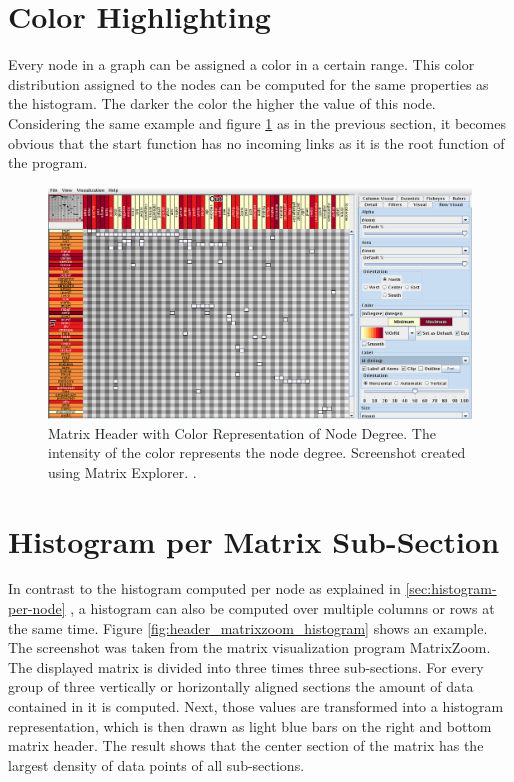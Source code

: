 \section{Color Highlighting}
Every node in a graph can be assigned a color in a certain range. This color distribution assigned to the nodes can be computed for the same properties as the histogram. The darker the color the higher the value of this node. Considering the same example and figure \ref{fig:header_matrixexplorer_color} as in the previous section, it becomes obvious that the start function has no incoming links as it is the root function of the program.
\begin{figure}[H]
  \includegraphics[width=\textwidth]{images/Header_MatrixExplorer_color.png}
  \caption{Matrix Header with Color Representation of Node Degree. The intensity of the color represents the node degree. Screenshot created using Matrix Explorer. \citep{henry-phd-2008}. \label{fig:header_matrixexplorer_color}}
\end{figure}

\section{Histogram per Matrix Sub-Section}
In contrast to the histogram computed per node as explained in \ref{sec:histogram-per-node} , a histogram can also be computed over multiple columns or rows at the same time. Figure \ref{fig:header_matrixzoom_histogram} shows an example. The screenshot was taken from the matrix visualization program MatrixZoom. The displayed matrix is divided into three times three sub-sections. For every group of three vertically or horizontally aligned sections the amount of data contained in it is computed. Next, those values are transformed into a histogram representation, which is then drawn as light blue bars on the right and bottom matrix header. The result shows that the center section of the matrix has the largest density of data points of all sub-sections.

